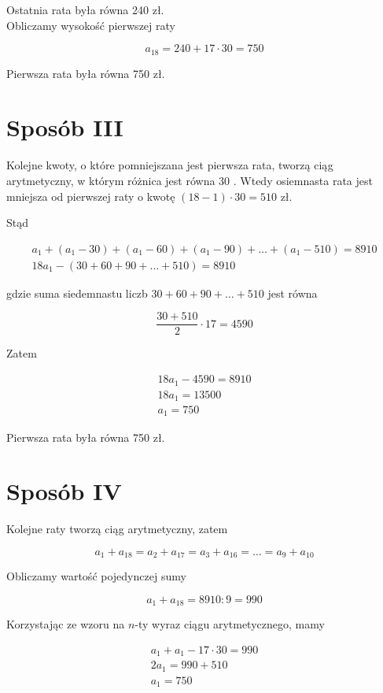 \documentclass[10pt]{article}
\begin{document}
Ostatnia rata była równa 240 zł.\\
Obliczamy wysokość pierwszej raty

$$
a_{18}=240+17 \cdot 30=750
$$

Pierwsza rata była równa 750 zł.

\section*{Sposób III}
Kolejne kwoty, o które pomniejszana jest pierwsza rata, tworzą ciąg arytmetyczny, w którym różnica jest równa 30 . Wtedy osiemnasta rata jest mniejsza od pierwszej raty o kwotę $(18-1) \cdot 30=510$ zł.

Stąd

$$
\begin{gathered}
a_{1}+\left(a_{1}-30\right)+\left(a_{1}-60\right)+\left(a_{1}-90\right)+\ldots+\left(a_{1}-510\right)=8910 \\
18 a_{1}-(30+60+90+\ldots+510)=8910
\end{gathered}
$$

gdzie suma siedemnastu liczb $30+60+90+\ldots+510$ jest równa

$$
\frac{30+510}{2} \cdot 17=4590
$$

Zatem

$$
\begin{gathered}
18 a_{1}-4590=8910 \\
18 a_{1}=13500 \\
a_{1}=750
\end{gathered}
$$

Pierwsza rata była równa 750 zł.

\section*{Sposób IV}
Kolejne raty tworzą ciąg arytmetyczny, zatem

$$
a_{1}+a_{18}=a_{2}+a_{17}=a_{3}+a_{16}=\ldots=a_{9}+a_{10}
$$

Obliczamy wartość pojedynczej sumy

$$
a_{1}+a_{18}=8910: 9=990
$$

Korzystając ze wzoru na $n$-ty wyraz ciągu arytmetycznego, mamy

$$
\begin{gathered}
a_{1}+a_{1}-17 \cdot 30=990 \\
2 a_{1}=990+510 \\
a_{1}=750
\end{gathered}
$$
\end{document}
